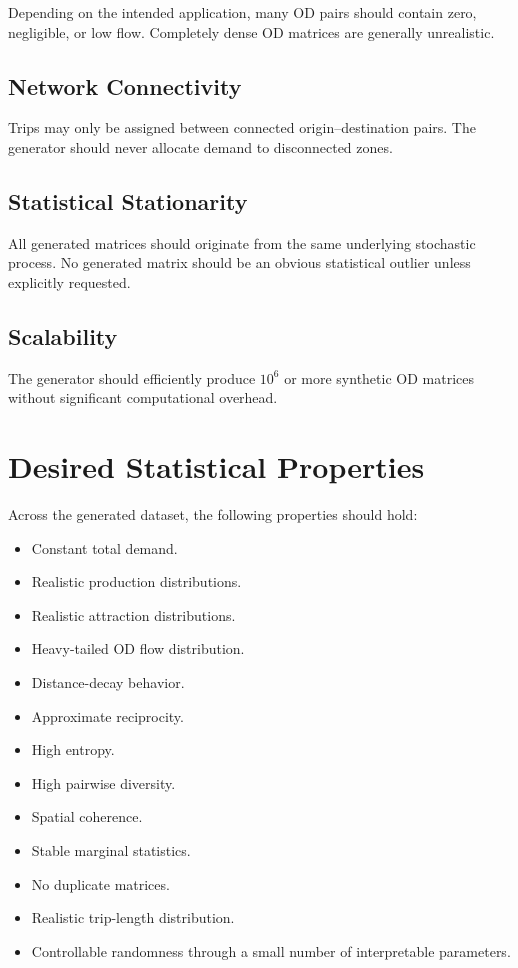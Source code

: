 \documentclass[11pt,a4paper]{article}
\begin{document}
Depending on the intended application, many OD pairs should contain zero, negligible, or low flow. Completely dense OD matrices are generally unrealistic.

\subsection{Network Connectivity}

Trips may only be assigned between connected origin--destination pairs. The generator should never allocate demand to disconnected zones.

\subsection{Statistical Stationarity}

All generated matrices should originate from the same underlying stochastic process. No generated matrix should be an obvious statistical outlier unless explicitly requested.

\subsection{Scalability}

The generator should efficiently produce $10^6$ or more synthetic OD matrices without significant computational overhead.

\section{Desired Statistical Properties}

Across the generated dataset, the following properties should hold:

\begin{itemize}
    \item Constant total demand.
    \item Realistic production distributions.
    \item Realistic attraction distributions.
    \item Heavy-tailed OD flow distribution.
    \item Distance-decay behavior.
    \item Approximate reciprocity.
    \item High entropy.
    \item High pairwise diversity.
    \item Spatial coherence.
    \item Stable marginal statistics.
    \item No duplicate matrices.
    \item Realistic trip-length distribution.
    \item Controllable randomness through a small number of interpretable parameters.
\end{itemize}
\end{document}
